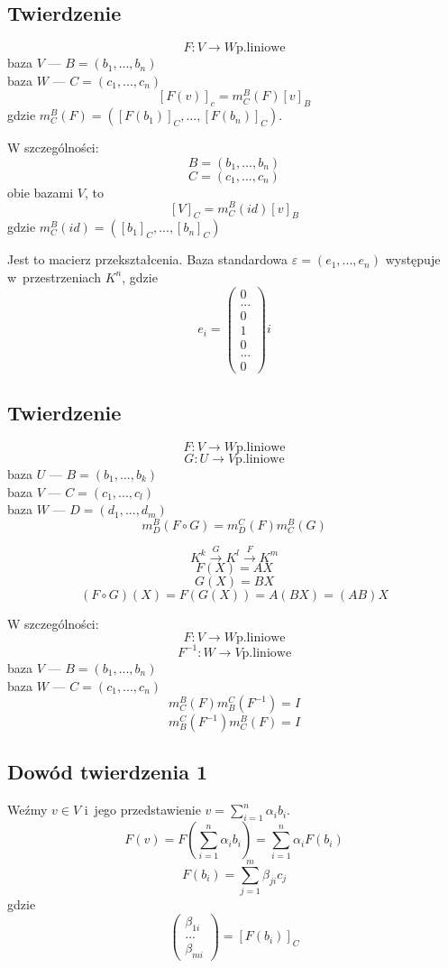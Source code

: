 \documentclass{article}
\begin{document}
  \subsection{Twierdzenie}
  \[ F: V \rightarrow W \mathrm{p. liniowe} \]
  baza $V$ --- $B=(b_1, ..., b_n)$ \\
  baza $W$ --- $C=(c_1, ..., c_n)$ \\
  \[ [F(v) ]_c = m^B_C(F)[v]_B \]
  gdzie $m^B_C(F)=([F(b_1)]_C, ..., [F(b_n)]_C)$.

  W szczególności:
  \[ B = (b_1, ..., b_n) \]
  \[ C = (c_1, ..., c_n) \]
  obie bazami $V$, to
  \[ [V]_C = m^B_C(id)[v]_B \]
  gdzie $m^B_C(id)=([b_1]_C, ..., [b_n]_C)$

  Jest to macierz przekształcenia.
  Baza standardowa $\varepsilon=(e_1, ..., e_n)$ występuje
  w~przestrzeniach $K^n$, gdzie
  \[e_i=\begin{pmatrix}0 \\ ... \\ 0 \\ 1 \\ 0 \\ ... \\ 0\end{pmatrix}i\]

  \subsection{Twierdzenie}
  \[ F: V \rightarrow W \mathrm{p. liniowe} \]
  \[ G: U \rightarrow V \mathrm{p. liniowe} \]
  baza $U$ --- $B=(b_1, ..., b_k)$ \\
  baza $V$ --- $C=(c_1, ..., c_l)$ \\
  baza $W$ --- $D=(d_1, ..., d_m)$ \\
  \[m^B_D(F\circ G)=m^C_D(F)m^B_C(G)\]

  \[K^k \overset{G}{\longrightarrow} K^l \overset{F}{\longrightarrow} K^m\]
  \[F(X) = AX\]
  \[G(X) = BX\]
  \[(F\circ G)(X) = F(G(X)) = A(BX) = (AB)X\]

  W szczególności:
  \[ F: V \rightarrow W \mathrm{p. liniowe} \]
  \[ F^{-1}: W \rightarrow V \mathrm{p. liniowe} \]
  baza $V$ --- $B=(b_1, ..., b_n)$ \\
  baza $W$ --- $C=(c_1, ..., c_n)$ \\
  \[m^B_C(F)m^C_B(F^{-1}) = I \]
  \[m^C_B(F^{-1})m^B_C(F) = I \]

  \subsection*{Dowód twierdzenia 1}
  Weźmy $v \in V$ i~jego przedstawienie $v=\sum_{i=1}^n\alpha_ib_i$.
  \[F(v)=F\left(\sum_{i=1}^n\alpha_ib_i\right)=\sum_{i=1}^n\alpha_iF(b_i)\]
  \[F(b_i)=\sum_{j=1}^m\beta_{ji}c_j\]
  gdzie
  \[\begin{pmatrix}\beta_{1i} \\ ... \\ \beta_{mi}\end{pmatrix}=[F(b_i)]_C\]
\end{document}
